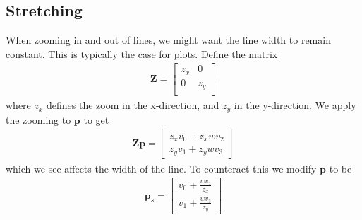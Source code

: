 \documentclass[11pt,a4paper]{article}
\begin{document}
\subsection{Stretching}
When zooming in and out of lines, we might want the line width to remain constant.
This is typically the case for plots. Define the matrix
%
\begin{align}
  \mathbf{Z} = \begin{bmatrix}
    z_x & 0 \\
    0 & z_y \\
  \end{bmatrix}
\end{align}
%
where $z_x$ defines the zoom in the x-direction, and $z_y$ in the y-direction.
We apply the zooming to $\mathbf{p}$ to get
%
\begin{align}
  \mathbf{Zp} = \begin{bmatrix}
    z_x v_0 + z_x w v_2 \\
    z_y v_1 + z_y w v_3
  \end{bmatrix}
\end{align}
%
which we see affects the width of the line. To counteract this we modify
$\mathbf{p}$ to be
%
\begin{align}
  \mathbf{p}_s = \begin{bmatrix}
    v_0 + \frac{w v_2}{z_x} \\
    v_1 + \frac{w v_3}{z_y}
  \end{bmatrix}
\end{align}
%
\end{document}

